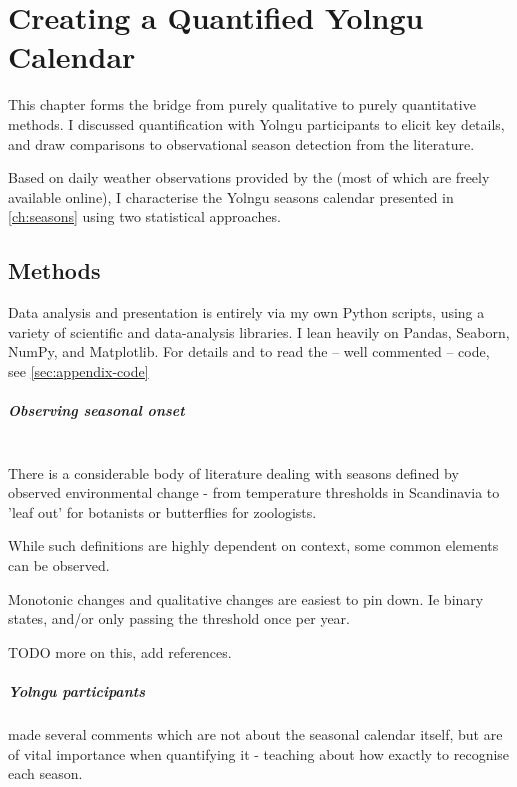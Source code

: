 \chapter{Creating a Quantified Yolngu Calendar}
\label{ch:quantify}

This chapter forms the bridge from purely qualitative to purely quantitative
methods.  I discussed quantification with Yolngu participants to elicit
key details, and draw comparisons to observational season detection from
the literature.

Based on daily weather observations provided by the \citet{BOM-data}
(most of which are freely available online), I characterise
the Yolngu seasons calendar presented in \autoref{ch:seasons}
using two statistical approaches.


\section{Methods}

Data analysis and presentation is entirely via my own Python scripts,
using a variety of scientific and data-analysis libraries.
I lean heavily on Pandas, Seaborn, NumPy, and Matplotlib.
For details and to read the -- well commented -- code, see
\autoref{sec:appendix-code}


\paragraph{Observing seasonal onset}~\\
There is a considerable body of literature dealing with seasons defined
by observed environmental change - from temperature thresholds in
Scandinavia to 'leaf out' for botanists or butterflies for zoologists.

While such definitions are highly dependent on context, some common
elements can be observed.  

Monotonic changes and qualitative changes are easiest to pin down.
Ie binary states, and/or only passing the threshold once per year.

TODO more on this, add references.


\paragraph{Yolngu participants} made several comments which are not about
the seasonal calendar itself, but are of vital importance when quantifying
it - teaching about how exactly to recognise each season.


